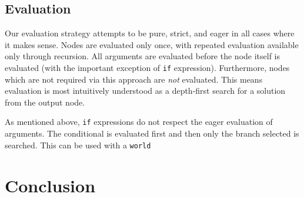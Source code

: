 \documentclass[12pt,UTF8,a4]{article}
\newcommand{\code}[1]{\texttt{#1}}
\begin{document}
\subsection{Evaluation}
Our evaluation strategy attempts to be pure, strict, and eager in all cases where it makes sense. Nodes are evaluated only once, with repeated evaluation available only through recursion. All arguments are evaluated before the node itself is evaluated (with the important exception of \code{if} expression). Furthermore, nodes which are not required via this approach are {\em not} evaluated. This means evaluation is most intuitively understood as a depth-first search for a solution from the output node.

As mentioned above, \code{if} expressions do not respect the eager evaluation of arguments. The conditional is evaluated first and then only the branch selected is searched. This can be used with a \code{world}

\section{Conclusion}
\end{document}
